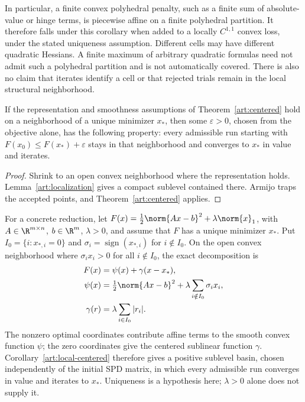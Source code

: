 In particular, a finite convex polyhedral penalty, such as a finite sum of
absolute-value or hinge terms, is piecewise affine on a finite polyhedral
partition. It therefore falls under this corollary when added to a locally
$C^{1,1}$ convex loss,
under the stated uniqueness assumption. Different cells may have different
quadratic Hessians. A finite maximum of arbitrary quadratic formulas need not
admit such a polyhedral partition and is not automatically covered.
There is also no claim that iterates identify a cell or that rejected trials
remain in the local structural neighborhood.

\begin{corollary}\label{art:local-centered}
If the representation and smoothness assumptions of
Theorem~\ref{art:centered} hold on a neighborhood of a unique minimizer $x_*$,
then some $\varepsilon>0$, chosen from the objective alone, has the following
property: every admissible run starting with
$F(x_0)\le F(x_*)+\varepsilon$ stays in that neighborhood and converges to
$x_*$ in value and iterates.
\end{corollary}
\begin{proof}
Shrink to an open convex neighborhood where the representation holds.
Lemma~\ref{art:localization} gives a compact sublevel contained there.
Armijo traps the accepted points, and Theorem~\ref{art:centered} applies.
\end{proof}

For a concrete reduction, let
$F(x)=\tfrac12\norm{Ax-b}^2+\lambda\norm{x}_1$, with
$A\in\R^{m\times n}$, $b\in\R^m$, $\lambda>0$, and assume that $F$ has a
unique minimizer $x_*$. Put $I_0=\{i:x_{*,i}=0\}$ and
$\sigma_i=\operatorname{sign}(x_{*,i})$ for $i\notin I_0$.
On the open convex neighborhood where $\sigma_i x_i>0$ for all
$i\notin I_0$, the exact decomposition is
\begin{equation}\label{art:local-l1-decomposition}
 \begin{aligned}
 F(x)&=\psi(x)+\gamma(x-x_*),\\
 \psi(x)&=\tfrac12\norm{Ax-b}^2+
                \lambda\sum_{i\notin I_0}\sigma_i x_i,\\
 \gamma(r)&=\lambda\sum_{i\in I_0}|r_i|.
 \end{aligned}
\end{equation}
The nonzero optimal coordinates contribute affine terms to the smooth
convex function $\psi$; the zero coordinates give the centered sublinear
function $\gamma$. Corollary~\ref{art:local-centered} therefore gives a
positive sublevel basin, chosen independently of the initial SPD matrix,
in which every admissible run converges in value and iterates to $x_*$.
Uniqueness is a hypothesis here; $\lambda>0$ alone does not supply it.

